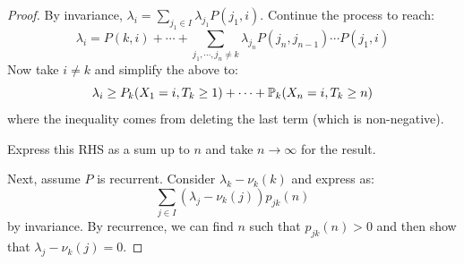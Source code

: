 \documentclass[../Main.tex]{subfiles}
\begin{document}
\begin{proof}
    By invariance, $\lambda_i = \sum_{j_1 \in I} \lambda_{j_1} P(j_1, i)$. Continue the process to reach:
    \begin{equation*}
        \lambda_i = P(k, i) + \cdots + \sum_{j_1, \cdots, j_n \neq k}\lambda_{j_n}P(j_n, j_{n-1}) \cdots P(j_1, i)
    \end{equation*}
    Now take $i \neq k$ and simplify the above to:
    \begin{equation*}
        \lambda_i \geq P_k(X_1 = i, T_k \geq 1) + \cdots + \P_k(X_n = i, T_k \geq n)
    \end{equation*}
    where the inequality comes from deleting the last term (which is non-negative).

    Express this RHS as a sum up to $n$ and take $n \to \infty$ for the result.

    Next, assume $P$ is recurrent. Consider $\lambda_k - \nu_k(k)$ and express as:
    \begin{equation*}
        \sum_{j \in I} (\lambda_j - \nu_k(j)) p_{jk}(n)
    \end{equation*}
    by invariance. By recurrence, we can find $n$ such that $p_{jk}(n) > 0$ and then show that $\lambda_j - \nu_k(j) = 0$.
\end{proof}
\end{document}
